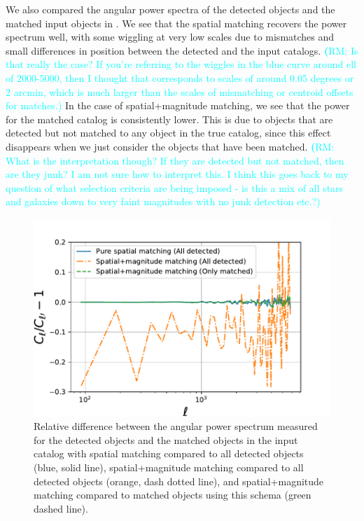 \documentclass[twocolumn]{aastex62}
\newcommand{\rachel}[1]{{\textcolor{cyan}{{\textbf (RM: #1)}}}}
\begin{document}
We also compared the angular power spectra of the detected objects and the matched input objects in . We see that the spatial matching recovers the power spectrum well, with some wiggling at very low scales due to mismatches and small differences in position between the detected and the input catalogs. \rachel{Is that really the case?  If you're referring to the wiggles in the blue curve around ell of 2000-5000, then I thought that corresponds to scales of around 0.05 degrees or 2 arcmin, which is much larger than the scales of mismatching or centroid offsets for matches.} In the case of spatial+magnitude matching, we see that the power for the matched catalog is consistently lower. This is due to objects that are detected but not matched to any object in the true catalog, since this effect disappears when we just consider the objects that have been matched. \rachel{What is the interpretation though?  If they are detected but not matched, then are they junk?  I am not sure how to interpret this.  I think this goes back to my question of what selection criteria are being imposed - is this a mix of all stars and galaxies down to very faint magnitudes with no junk detection etc.?}

\begin{figure}
\centering
\includegraphics[width=0.9\columnwidth]{cl_comparison_matching.pdf}
\caption{Relative difference between the angular power spectrum measured for the detected objects and the matched objects in the input catalog with spatial matching compared to all detected objects (blue, solid line), spatial+magnitude matching compared to all detected objects (orange, dash dotted line), and spatial+magnitude matching compared to matched objects using this schema (green dashed line).}
\label{fig:matching_cls}
\end{figure}
\end{document}
